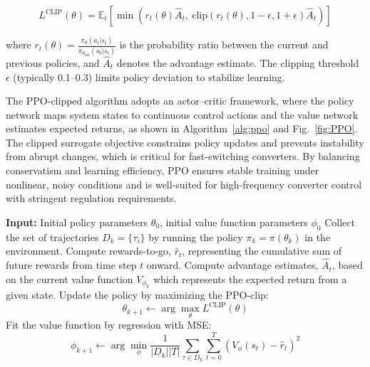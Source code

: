 \documentclass[conference]{IEEEtran}
\begin{document}
\begin{equation}
L^{\text{CLIP}}(\theta) = \mathbb{E}_t \left[ \min \left( r_t(\theta) \hat{A}_t, \ \text{clip}(r_t(\theta), 1 - \epsilon, 1 + \epsilon) \hat{A}_t \right) \right]
\label{eq:ppo_clip}
\end{equation}

where $r_t(\theta) = \frac{\pi_\theta(a_t | s_t)}{\pi_{\theta_{\text{old}}}(a_t | s_t)}$ is the probability ratio between the current and previous policies, and $\hat{A}_t$ denotes the advantage estimate. The clipping threshold $\epsilon$ (typically 0.1–0.3) limits policy deviation to stabilize learning.

The PPO-clipped algorithm adopts an actor--critic framework, where the policy network maps system states to continuous control actions and the value network estimates expected returns, as shown in Algorithm~\ref{alg:ppo} and Fig.~\ref{fig:PPO}. The clipped surrogate objective constrains policy updates and prevents instability from abrupt changes, which is critical for fast-switching converters. By balancing conservatism and learning efficiency, PPO ensures stable training under nonlinear, noisy conditions and is well-suited for high-frequency converter control with stringent regulation requirements.





\begin{algorithm}[!t]
\caption{PPO-clipped}
\label{alg:ppo}
\begin{algorithmic}[1]
\State \textbf{Input:} Initial policy parameters $\theta_0$, initial value function parameters $\phi_0$
    \State Collect the set of trajectories $D_k = \{\tau_i\}$ by running the policy $\pi_k = \pi(\theta_k)$ in the environment.
    \State Compute rewards-to-go, $\hat{r}_t$, representing the cumulative sum of future rewards from time step $t$ onward.
    \State Compute advantage estimates, $\hat{A}_t$, based on the current value function $V_{\phi_k}$ which represents the expected return from a given state.
    \State Update the policy by maximizing the PPO-clip:
    \[
        \theta_{k+1} \leftarrow \arg\max_\theta L^{\text{CLIP}}(\theta)
    \]
   \State Fit the value function by regression with MSE:
    \[
        \phi_{k+1} \leftarrow \arg\min_\phi \frac{1}{|D_k||T|} \sum_{\tau \in D_k} \sum_{t=0}^{T} \left( V_\phi(s_t) - \hat{r}_t \right)^2
   \]
\EndFor
\end{algorithmic}
\end{algorithm}
\end{document}
